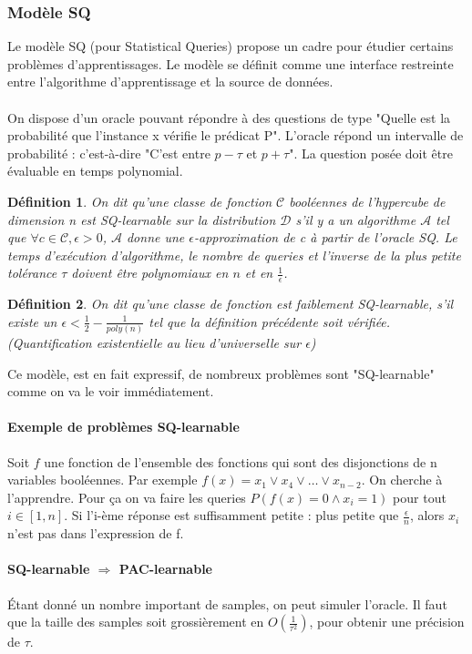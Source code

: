 \documentclass{article}		%
\newtheorem{defi}{Définition}
\theoremstyle{definition}
\theoremstyle{plain}
\theoremstyle{plain}
\theoremstyle{plain}
\theoremstyle{plain}
\begin{document}
\subsubsection{Modèle SQ}
Le modèle SQ (pour Statistical Queries) propose un cadre pour étudier
certains problèmes d'apprentissages. Le modèle se définit comme une
interface restreinte entre l'algorithme d'apprentissage et la source de
données.
\\
\\
On dispose d'un oracle pouvant répondre à des questions de type "Quelle
est la probabilité que l'instance x vérifie le prédicat P". L'oracle
répond un intervalle de probabilité : c'est-à-dire "C'est entre
$p - \tau$ et $p + \tau$". La question posée doit être évaluable
en temps polynomial.
\\
\begin{defi}
On dit qu'une classe de fonction $\mathcal{C}$ booléennes de l'hypercube
de dimension n est SQ-learnable sur la
distribution $\mathcal{D}$ s'il y a un algorithme $\mathcal{A}$
tel que $\forall c \in \mathcal{C}, \epsilon>0$, $\mathcal{A}$ donne une
$\epsilon$-approximation de c à partir de l'oracle SQ. Le temps
d'exécution d'algorithme, le nombre de queries et l'inverse de la plus
petite tolérance $\tau$ doivent être polynomiaux en $n$ et en
$\frac{1}{\epsilon}$. 
\end{defi}
\begin{defi}
On dit qu'une classe de fonction est faiblement SQ-learnable, s'il existe
un $\epsilon<\frac{1}{2}-\frac{1}{poly(n)}$ tel que la définition
précédente soit vérifiée.(Quantification existentielle au lieu
d'universelle sur $\epsilon$) 
\end{defi}
Ce modèle, est en fait expressif, de nombreux problèmes sont
"SQ-learnable" comme on va le voir immédiatement.
\paragraph{Exemple de problèmes SQ-learnable}
Soit $f$ une fonction de l'ensemble des fonctions qui sont des
disjonctions de n variables booléennes. Par exemple
$f(x)=x_1 \vee x_4 \vee \dots \vee x_{n-2}$.
On cherche à l'apprendre. Pour ça on va faire les queries
$P(f(x)=0\wedge x_i=1)$ pour tout $i\in [1,n]$. Si l'i-ème réponse est
suffisamment petite : plus petite que $\frac{\epsilon}{n}$, alors $x_i$
n'est pas dans l'expression de f.  
\paragraph{SQ-learnable $\Rightarrow$ PAC-learnable}
Étant donné un nombre important de samples, on peut simuler l'oracle. Il
faut que la taille des samples soit grossièrement en
$O(\frac{1}{\tau^2})$, pour obtenir une précision de $\tau$.
  
\end{document}
